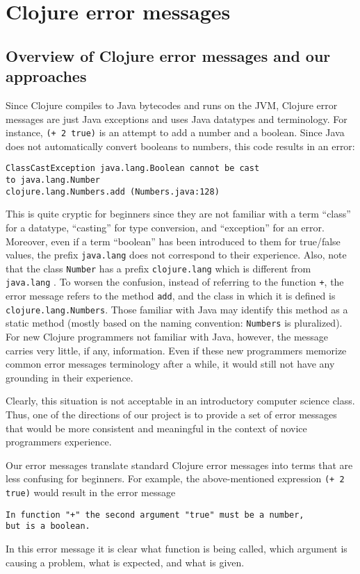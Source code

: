 \documentclass[12pt]{article}
\begin{document}
\section{Clojure error messages}\label{sec:current}
\subsection{Overview of Clojure error messages and our approaches}
Since Clojure compiles to Java bytecodes and runs on the JVM, Clojure error messages are just Java exceptions
and uses Java datatypes and terminology. 
For instance, {\tt (+ 2 true)} is an attempt to add a number and a boolean. 
Since Java does not automatically convert booleans to numbers, this code results in an error:
\begin{verbatim}
ClassCastException java.lang.Boolean cannot be cast 
to java.lang.Number  
clojure.lang.Numbers.add (Numbers.java:128)
\end{verbatim} 
This is quite cryptic for beginners since they are not familiar with a term ``class'' for a datatype,
``casting'' for type conversion, and ``exception'' for an error. Moreover, even if a term ``boolean'' 
has been introduced to them for true/false values, the prefix {\tt  java.lang} does not 
correspond to their experience. Also, note that the class {\tt Number} has a prefix {\tt  clojure.lang}
which is different from {\tt  java.lang} . To worsen the confusion, instead of referring
to the function {\tt +}, the error message refers to the method {\tt add}, and the class 
in which it is defined is {\tt clojure.lang.Numbers}. Those familiar with Java may identify this
method as a static method (mostly based on the naming convention: {\tt Numbers} is pluralized). 
For new Clojure programmers not familiar with Java, however, the message carries very little, if any, information. 
Even if these new programmers memorize common error messages terminology after a while, 
it would still not have any grounding in their experience. 

Clearly, this situation is not acceptable in an introductory computer science class. Thus, one of the directions of our project is to 
provide a set of error messages that would be more consistent and meaningful in the context of 
novice programmers experience. 

Our error messages translate standard Clojure error messages into terms that are less confusing for beginners. 
For example, the above-mentioned expression  {\tt (+ 2 true)} would result in the error message
\begin{verbatim}
In function "+" the second argument "true" must be a number, 
but is a boolean. 
\end{verbatim} 
In this error message it is clear what function is being called, which argument is causing a problem, 
what is expected, and what is given. 
\end{document}
